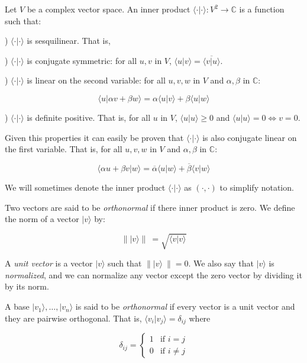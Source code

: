 \begin{definition}
	Let $V$ be a complex vector space. An inner product $\langle \cdot | \cdot \rangle: V^2 \rightarrow \mathds{C}$ is a function such that:
	
	) $\langle \cdot | \cdot \rangle$ is sesquilinear. That is,
	
	) $\langle \cdot | \cdot \rangle$ is conjugate symmetric: for all $u,v$ in $V$, $\langle u | v \rangle = \overline{\langle v | u \rangle}$.
	
	) $\langle \cdot | \cdot \rangle$ is linear on the second variable: for all $u,v,w$ in $V$ and $\alpha, \beta$ in $\mathds{C}$:
	
	$$ \langle u  | \alpha v + \beta w \rangle = \alpha \langle u | v \rangle + \beta \langle u | w \rangle $$
	
	) $\langle \cdot | \cdot \rangle$ is definite positive. That is, for all $u$ in $V$, $\langle u | u \rangle \geq 0$ and $\langle u | u \rangle = 0 \Longleftrightarrow v = 0$.
\end{definition}

Given this properties it can easily be proven that $\langle \cdot | \cdot \rangle$ is also conjugate linear on the first variable. That is, for all $u,v,w$ in $V$ and $\alpha, \beta$ in $\mathds{C}$:

$$ \langle \alpha u + \beta v  | w \rangle = \overline{\alpha} \langle u | w \rangle + \overline{\beta} \langle v | w \rangle $$

We will sometimes denote the inner product $\langle \cdot | \cdot \rangle$ as $( \cdot , \cdot )$ to simplify notation.

Two vectors are said to be \emph{orthonormal} if there inner product is zero. We define the norm of a vector $|v\rangle$ by:

$$\parallel |v\rangle \parallel \ = \sqrt{ \langle v|v\rangle }$$

A \emph{unit vector} is a vector $|v\rangle$ such that $\parallel |v\rangle \  \parallel = 0 $. We also say that $|v\rangle$ is \emph{normalized}, and we can normalize any vector except the zero vector by dividing it by its norm.

A base $|v_1\rangle, \dotsc, |v_n\rangle$ is said to be \emph{orthonormal} if every vector is a unit vector and they are pairwise orthogonal. That is, $\langle v_i|v_j\rangle = \delta_{ij}$ where

\[
\delta_{ij} = 
\begin{cases}
	1 & \text{if } i = j  \\
	0 & \text{if } i \neq j
\end{cases}
\]

